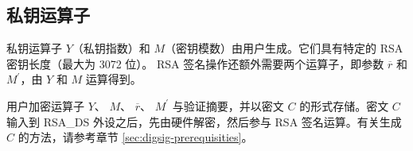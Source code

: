 \documentclass[main\_\_CN.tex]{subfiles}
\begin{document}
\subsection{私钥运算子}
\label{sec:digsig-private-key-operands}

私钥运算子 \begin{math}Y\end{math}（私钥指数）和 \begin{math}M\end{math}（密钥模数）由用户生成。它们具有特定的 RSA 密钥长度（最大为 3072 位）。
RSA 签名操作还额外需要两个运算子，即参数 \begin{math}\overline{r}\end{math} 和 \begin{math}M^{\prime}\end{math}，由 \begin{math}Y\end{math} 和 \begin{math}M\end{math} 运算得到。


用户加密运算子 \begin{math}Y\end{math}、
\begin{math}M\end{math}、
\begin{math}\overline{r}\end{math}、
\begin{math}M^{\prime}\end{math} 与验证摘要，并以密文 \begin{math}C\end{math} 的形式存储。密文 \begin{math}C\end{math} 输入到 RSA\_DS 外设之后，先由硬件解密，然后参与 RSA 签名运算。有关生成 \begin{math}C\end{math} 的方法，请参考章节 \ref{sec:digsig-prerequisities}。
\end{document}
